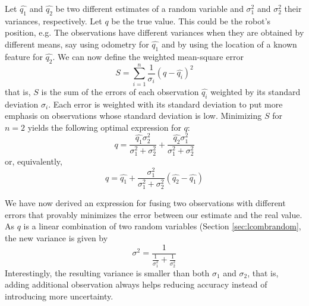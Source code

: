  Let $ \hat{q_1}$ and $ \hat{q_2}$ be two different estimates of a random variable and $ \sigma^2_1$ and $ \sigma^2_2$ their variances, respectively. Let $ q$ be the true value. This could be the robot's position, e.g. The observations have different variances when they are obtained by  different means, say using odometry for $ \hat{q_1}$ and by using the location of a known feature for $ \hat{q_2}$. We can now define the weighted mean-square error
 \begin{equation}
S=\displaystyle\sum_{i=1}^{n}\frac{1}{\sigma_i} (q-\hat{q_i})^2
\end{equation}
that is, $ S$ is the sum of the errors of each observation $ \hat{q_i}$ weighted by its standard deviation $ \sigma_i$. Each error is weighted  with its standard deviation to put more emphasis on observations whose standard deviation is low. Minimizing  $S$ for $n=2$ yields the following optimal expression for $q$:
\begin{equation}
q=\frac{\hat{q_1}\sigma_2^2}{\sigma_1^2+\sigma_2^2}+\frac{\hat{q_2}\sigma_1^2}{\sigma_1^2+\sigma_2^2}
\end{equation}
or, equivalently, 
\begin{equation}
q=\hat{q_1}+\frac{\sigma_1^2}{\sigma_1^2+\sigma_2^2}(\hat{q_2}-\hat{q_1})\label{eq:optimalfusion}
\end{equation}

We have now derived an expression for fusing two observations with different errors that provably minimizes the error between our estimate and the real value. As $q$ is a linear combination of two random variables (Section \ref{sec:lcombrandom}, the new variance is given by
\begin{equation}
\sigma^2=\frac{1}{\frac{1}{\sigma_1^2}+\frac{1}{\sigma_2^2}}
\end{equation}
Interestingly, the resulting variance is smaller than both $\sigma_1$ and $\sigma_2$, that is, adding additional observation always helps  reducing accuracy instead of introducing more uncertainty. 

